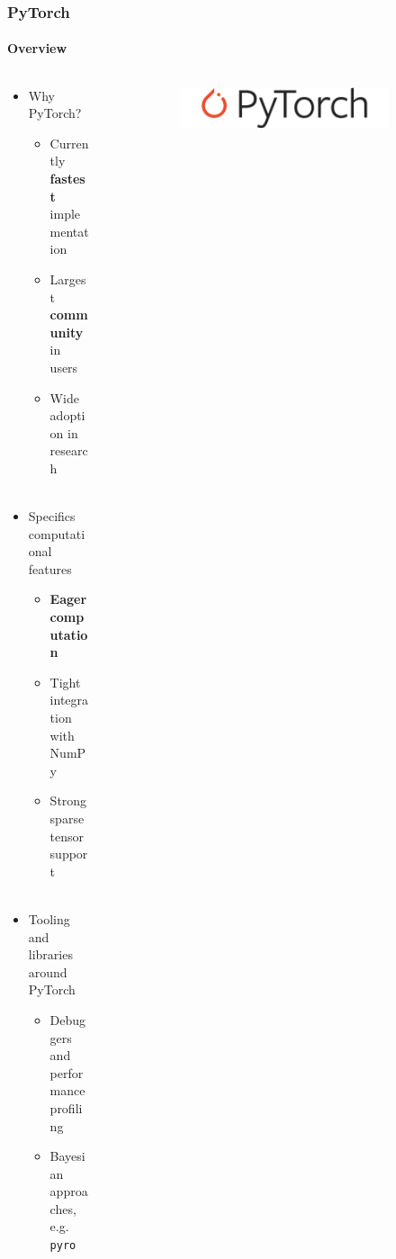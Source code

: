 \documentclass[aspectratio=1610]{beamer}
\begin{document}
\begin{frame}
    \frametitle{PyTorch}
    \framesubtitle{Overview}
    
    \begin{columns}
        \begin{column}{0.48\textwidth}
            \begin{itemize}
                \item Why PyTorch?
                \begin{itemize}
                    \item Currently \textbf{fastest} implementation
                    \item Largest \textbf{community} in users
                    \item Wide adoption in research\\~
                \end{itemize}
                \item Specifics computational features
                \begin{itemize}
                    \item \textbf{Eager computation}
                    \item Tight integration with NumPy
                    \item Strong sparse tensor support\\~
                \end{itemize}
                \item Tooling and libraries around PyTorch
                \begin{itemize}
                    \item Debuggers and performance profiling
                    \item Bayesian approaches, e.g. \texttt{pyro}
                \end{itemize}
            \end{itemize}
        \end{column}
        \begin{column}{0.48\textwidth}
            \begin{figure}
                \centering
                \begin{figure}
                    \centering
                    \includegraphics[width=0.95\linewidth]{images/pytorch.png}
                \end{figure}
            \end{figure}
        \end{column}
    \end{columns}
\end{frame}
\end{document}
